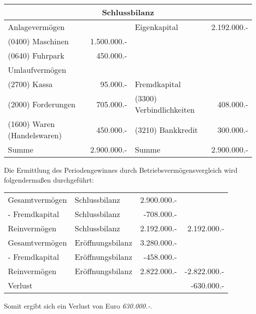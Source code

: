 \documentclass[parskip=half,12pt,a4paper]{scrartcl}
\begin{document}
\begin{center}
	\begin{tabular}{lr|lr}
		\multicolumn{4}{c}{Schlussbilanz}\\
		\toprule
		Anlagevermögen & & Eigenkapital & 2.192.000.-\\
		(0400) Maschinen & 1.500.000.- & &\\
		(0640) Fuhrpark & 450.000.- & &\\
		Umlaufvermögen & & &\\
		(2700) Kassa & 95.000.- & Fremdkapital &\\
		(2000) Forderungen & 705.000.- & (3300) Verbindlichkeiten & 408.000.-\\
		(1600) Waren (Handelswaren) & 450.000.- & (3210) Bankkredit & 300.000.-\\
		\bottomrule
		Summe & 2.900.000.- & Summe & 2.900.000.-\\
	\end{tabular}
\end{center}

Die Ermittlung des Periodengewinnes durch Betriebsvermögensvergleich wird folgendermaßen durchgeführt:

\begin{center}
	\begin{tabular}{llrr}
		Gesamtvermögen & Schlussbilanz & 2.900.000.- &\\
		- Fremdkapital & Schlussbilanz & -708.000.- &\\
		\midrule
		Reinvermögen & Schlussbilanz & 2.192.000.- & 2.192.000.-\\		
		Gesamtvermögen & Eröffnungsbilanz & 3.280.000.- &\\
		- Fremdkapital & Eröffnungsbilanz & -458.000.- &\\
		\midrule
		Reinvermögen & Eröffnungsbilanz & 2.822.000.-& -2.822.000.-\\		
		\midrule
		Verlust & & & -630.000.-\\
		\bottomrule
	\end{tabular}
\end{center}

Somit ergibt sich ein Verlust von Euro \emph{630.000.-}.
\end{document}
